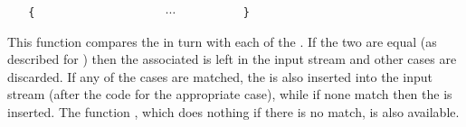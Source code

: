 \documentclass[oneside]{book}
\begin{document}
\begin{function}{\TlVarCaseTF}
\begin{syntax}
 
~ ~ \verb"{"
~ ~ ~ ~  
~ ~ ~ ~  
~ ~ ~ ~ $\cdots$
~ ~ ~ ~  
~ ~ \verb"}"
~ ~ 
~ ~ 
\end{syntax}
This function compares the  in turn
with each of the . If the two
are equal (as described for )
then the associated  is left in the input
stream and other cases are discarded. If any of the
cases are matched, the  is also inserted into the
input stream (after the code for the appropriate case), while if none
match then the  is inserted. The function ,
which does nothing if there is no match, is also available.
\begin{demohigh}
\IgnoreSpacesOn
\TlSet {}
\TlSet {}
\TlSet {}
\TlSet {}
\TlVarCaseTF {}
\IgnoreSpacesOff
\end{demohigh}
\end{function}
\end{document}
